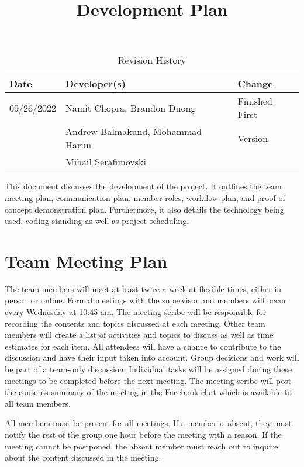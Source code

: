 \documentclass{article}
\title{Development Plan\\\progname}
\author{\authname}
\date{}
\begin{document}
\begin{table}[hp]
\caption{Revision History} \label{TblRevisionHistory}
\begin{tabularx}{\textwidth}{llX}
\toprule
\textbf{Date} & \textbf{Developer(s)} & \textbf{Change}\\
\midrule
09/26/2022 & Namit Chopra, Brandon Duong  & Finished First\\
 & Andrew Balmakund, Mohammad Harun &  Version\\
 & Mihail Serafimovski & \\
\bottomrule
\end{tabularx}
\end{table}

\newpage

\maketitle

This document discusses the development of the project. It outlines the team meeting plan, communication plan, member roles, workflow plan, and proof of concept demonstration plan. Furthermore, it also details the technology being used, coding standing as well as project scheduling.

\section{Team Meeting Plan}
The team members will meet at least twice a week at flexible times, either in person or online. Formal meetings with the supervisor and members will occur every Wednesday at 10:45 am. The meeting scribe will be responsible for recording the contents and topics discussed at each meeting. Other team members will create a list of activities and topics to discuss as well as time estimates for each item. All attendees will have a chance to contribute to the discussion and have their input taken into account. Group decisions and work will be part of a team-only discussion. Individual tasks will be assigned during these meetings to be completed before the next meeting. The meeting scribe will post the contents summary of the meeting in the Facebook chat which is available to all team members.

All members must be present for all meetings. If a member is absent, they must notify the rest of the group one hour before the meeting with a reason. If the meeting cannot be postponed, the absent member must reach out to inquire about the content discussed in the meeting.
\end{document}
